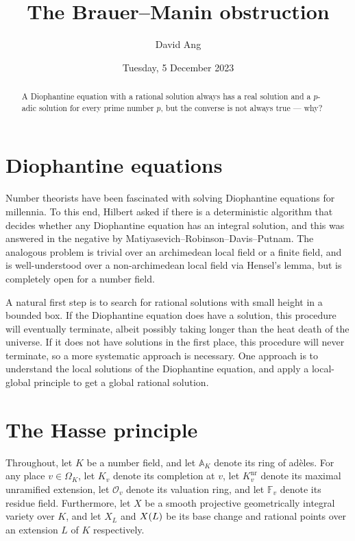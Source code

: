 \documentclass{article}
\title{The Brauer--Manin obstruction}
\author{David Ang}
\date{Tuesday, 5 December 2023}
\theoremstyle{plain}
\theoremstyle{definition}
\renewcommand{\AA}{\mathbb{A}}
\newcommand{\FF}{\mathbb{F}}
\newcommand{\nr}{\mathrm{nr}}
\newcommand{\OOO}{\mathcal{O}}
\newcommand{\br}{\!\del}
\begin{document}
\maketitle

\begin{abstract}
A Diophantine equation with a rational solution always has a real solution and a $ p $-adic solution for every prime number $ p $, but the converse is not always true --- why?
\end{abstract}

\section{Diophantine equations}

Number theorists have been fascinated with solving Diophantine equations for millennia. To this end, Hilbert asked if there is a deterministic algorithm that decides whether any Diophantine equation has an integral solution, and this was answered in the negative by Matiyasevich--Robinson--Davis--Putnam. The analogous problem is trivial over an archimedean local field or a finite field, and is well-understood over a non-archimedean local field via Hensel's lemma, but is completely open for a number field.

A natural first step is to search for rational solutions with small height in a bounded box. If the Diophantine equation does have a solution, this procedure will eventually terminate, albeit possibly taking longer than the heat death of the universe. If it does not have solutions in the first place, this procedure will never terminate, so a more systematic approach is necessary. One approach is to understand the local solutions of the Diophantine equation, and apply a local-global principle to get a global rational solution.

\section{The Hasse principle}

Throughout, let $ K $ be a number field, and let $ \AA_K $ denote its ring of ad\`eles. For any place $ v \in \Omega_K $, let $ K_v $ denote its completion at $ v $, let $ K_v^\nr $ denote its maximal unramified extension, let $ \OOO_v $ denote its valuation ring, and let $ \FF_v $ denote its residue field. Furthermore, let $ X $ be a smooth projective geometrically integral variety over $ K $, and let $ X_L $ and $ X\br{L} $ be its base change and rational points over an extension $ L $ of $ K $ respectively.
\end{document}
